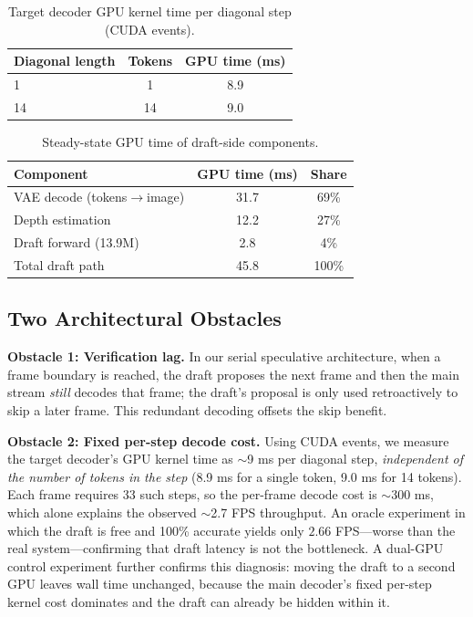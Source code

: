 \documentclass[10pt, twocolumn]{article}
\begin{document}
\begin{table}[!ht]
  \centering
  \small
  \caption{Target decoder GPU kernel time per diagonal step (CUDA events).}
  \label{tab:stepcost}
  \begin{tabular}{lcc}
    \toprule
    Diagonal length & Tokens & GPU time (ms) \\
    \midrule
    1 & 1 & 8.9 \\
    14 & 14 & 9.0 \\
    \bottomrule
  \end{tabular}
\end{table}

\begin{table}[!ht]
  \centering
  \small
  \caption{Steady-state GPU time of draft-side components.}
  \label{tab:breakdown}
  \begin{tabular}{lcc}
    \toprule
    Component & GPU time (ms) & Share \\
    \midrule
    VAE decode (tokens$\to$image) & 31.7 & 69\% \\
    Depth estimation & 12.2 & 27\% \\
    Draft forward (13.9M) & 2.8 & 4\% \\
    \midrule
    Total draft path & 45.8 & 100\% \\
    \bottomrule
  \end{tabular}
\end{table}

\subsection{Two Architectural Obstacles}
\label{sec:obstacles}

\textbf{Obstacle 1: Verification lag.} In our serial speculative architecture, when a frame boundary is reached, the draft proposes the next frame and then the main stream \emph{still} decodes that frame; the draft's proposal is only used retroactively to skip a later frame. This redundant decoding offsets the skip benefit.

\textbf{Obstacle 2: Fixed per-step decode cost.} Using CUDA events, we measure the target decoder's GPU kernel time as $\sim$9 ms per diagonal step, \emph{independent of the number of tokens in the step} (8.9 ms for a single token, 9.0 ms for 14 tokens). Each frame requires 33 such steps, so the per-frame decode cost is $\sim$300 ms, which alone explains the observed $\sim$2.7 FPS throughput. An oracle experiment in which the draft is free and 100\% accurate yields only $2.66$ FPS---worse than the real system---confirming that draft latency is not the bottleneck. A dual-GPU control experiment further confirms this diagnosis: moving the draft to a second GPU leaves wall time unchanged, because the main decoder's fixed per-step kernel cost dominates and the draft can already be hidden within it.
\end{document}

